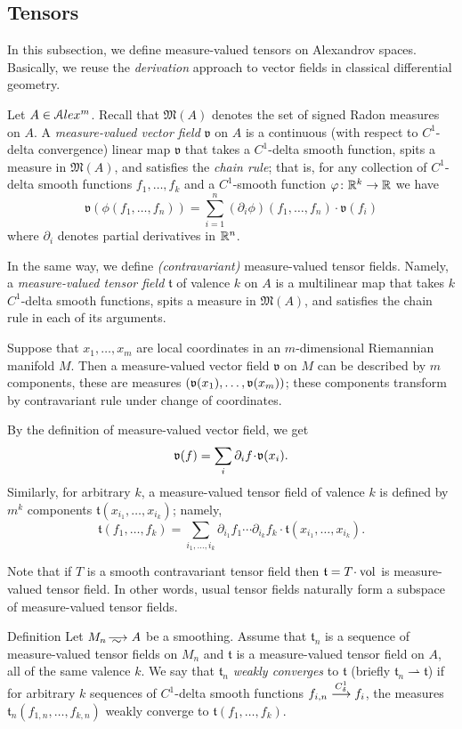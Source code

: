  
\subsection{Tensors}

In this subsection, we define measure-valued tensors on Alexandrov spaces.
Basically, we reuse the \emph{derivation} approach to vector fields in classical differential geometry. 

Let $A\in \mathcal{A}lex^m$.
Recall that $\mathfrak M(A)$
denotes the set of signed Radon measures on $A$.
A \emph{measure-valued vector field} $\mathfrak{v}$  on $A$
is a  continuous (with respect to 
$C^1$-delta 
convergence) linear map
$\mathfrak{v}$ that takes a $C^1$-delta smooth function,
spits a measure in $\mathfrak M(A)$,
and satisfies the \emph{chain rule};
that is, for any collection of $C^1$-delta smooth functions  $f_1,\dots,f_k$
and a $C^1$-smooth function $\varphi\colon\mathbb{R}^k\to\mathbb{R}$ we have
$$\mathfrak{v}(\phi(f_1,\dots,f_n))
=
\sum_{i=1}^n (\partial_i\phi)(f_1,\dots,f_n)\cdot\mathfrak{v}(f_i)$$
where $\partial_i$ denotes partial derivatives in $\mathbb{R}^n$.

In the same way, we define \emph{(contravariant)} measure-valued tensor fields.
Namely, a \emph{measure-valued tensor field} $\mathfrak{t}$ of valence $k$ on $A$ is a multilinear map that takes $k$ $C^1$-delta smooth  functions, spits a measure in $\mathfrak M(A)$, and satisfies the chain rule in each of its arguments.

Suppose that $x_1,\dots,x_m$ are local coordinates in an $m$-dimensional Riemannian manifold $M$.
Then a measure-valued vector field $\mathfrak{v}$ on $M$ can be described by $m$ components, these are measures $(\mathfrak{v}(x_1),\dots,\mathfrak{v}(x_m))$;
these components transform by contravariant rule under change of coordinates.

By the definition of measure-valued vector field, we get
\[\mathfrak{v}(f)=\sum_{i}\partial_i f\cdot \vv(x_i).\]
Similarly, for arbitrary $k$, a measure-valued tensor field of valence $k$ is defined by $m^k$ components 
$\mathfrak{t}(x_{i_1},\dots,x_{i_k})$; namely,
\[\mathfrak{t}(f_1,\dots,f_k)
=
\sum_{i_1,\dots,i_k}
\partial_{i_1} f_1 
\cdots 
\partial_{i_k} f_k
\cdot \mathfrak{t}(x_{i_1},\dots,x_{i_k}).\]

Note that if $T$ is a smooth contravariant tensor field then $\mathfrak{t}=T\cdot \vol$ is measure-valued tensor field.
In other words, usual tensor fields naturally form a subspace of measure-valued tensor fields.

\begin{rdef} {Definition}
Let $M_n\smooths{} A$ be a smoothing.
Assume that $\mathfrak{t}_n$ is a sequence of %
 measure-valued tensor fields on $M_n$  and $\mathfrak{t}$ is a
measure-valued tensor field on $A$,
all of the same valence $k$.
We say that $\mathfrak{t}_n$ \emph{weakly converges} to  $\mathfrak{t}$
(briefly $\mathfrak{t}_n\rightharpoonup\mathfrak{t}$) if for arbitrary $k$
sequences of $C^1$-delta smooth functions 
$f_{i,n}\stackrel{C^1_\delta}{\longrightarrow} f_i$, the measures $\mathfrak{t}_n(f_{1,n},\dots,f_{k,n})$ weakly converge to $\mathfrak{t}(f_{1},\dots,f_{k})$.
\end{rdef}

